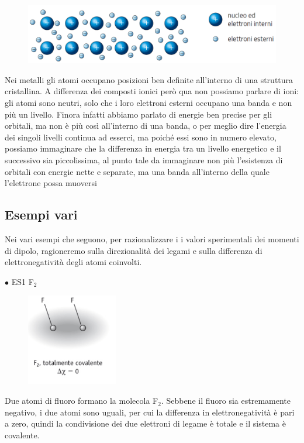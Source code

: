 \begin{figure}[htp]
    \centering
    \includegraphics[width=12cm]{immagini/legame-metallico.png}
\end{figure}

Nei metalli gli atomi occupano posizioni ben definite all'interno di una struttura cristallina. A differenza dei composti ionici però qua non possiamo parlare di ioni: gli atomi sono neutri, solo che i loro elettroni esterni occupano una banda e non più un livello. Finora infatti abbiamo parlato di energie ben precise per gli orbitali, ma non è più così all'interno di una banda, o per meglio dire l'energia dei singoli livelli continua ad esserci, ma poiché essi sono in numero elevato, possiamo immaginare che la differenza in energia tra un livello energetico e il successivo sia piccolissima, al punto tale da immaginare non più l'esistenza di orbitali con energie nette e separate, ma una banda all'interno della quale l'elettrone possa muoversi

\subsection{Esempi vari}
Nei vari esempi che seguono, per razionalizzare i i valori sperimentali dei momenti di dipolo, ragioneremo sulla direzionalità dei legami e sulla differenza di elettronegatività degli atomi coinvolti.

$\bullet$ ES1 F$_2$

\begin{figure}[htp]
    \centering
    \includegraphics[width=4cm]{immagini/F_2.png}
\end{figure}

Due atomi di fluoro formano la molecola F$_2$. Sebbene il fluoro sia estremamente negativo, i due atomi sono uguali, per cui la differenza in elettronegatività è pari a zero, quindi la condivisione dei due elettroni di legame è totale e il sistema è covalente.

